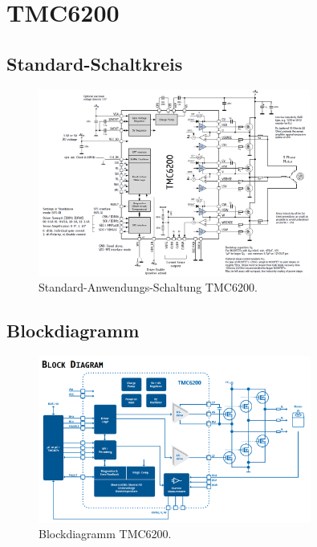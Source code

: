 \section{TMC6200}\label{Appendix:TMC6200}

\subsection{Standard-Schaltkreis}

\begin{figure}[H]
	\centering
	\includegraphics[width=0.8\textwidth]{graphics/Standard_Application_Cirquit_TMC6200.png}
	\caption{Standard-Anwendungs-Schaltung TMC6200.}
	\label{fig:Schaltung_TMC6200}
\end{figure}

\subsection{Blockdiagramm}

\begin{figure}[H]
	\centering
	\includegraphics[width=0.8\textwidth]{graphics/Blockdiagramm_TMC6200.png}
	\caption{Blockdiagramm TMC6200.}
	\label{fig:Blockdiagramm_TMC6200}
\end{figure}

